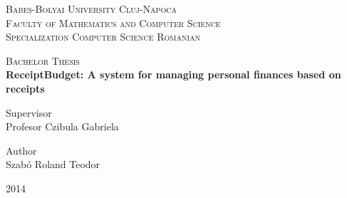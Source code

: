 \begin{titlepage}
    \begin{center}
        \vspace*{1cm}
        
        \Large
        \textsc{Babeș-Bolyai University Cluj-Napoca} \\
		\textsc{Faculty of Mathematics and Computer Science} \\
		\textsc{Specialization Computer Science Romanian}

		\vspace{1.5cm}
        \Huge
        \textsc{Bachelor Thesis} \\[1cm]
        \textbf{ReceiptBudget: A system for managing personal finances based on receipts}
\end{center}        

        \vspace{2cm}
		\Large
        \begin{minipage}[t]{0.5\textwidth}
       		Supervisor \\
        	Profesor Czibula Gabriela \\
		\end{minipage}
		\begin{minipage}[t]{0.5\textwidth}
			\begin{flushright}
				Author \\
				Szabó Roland Teodor
			\end{flushright}
		\end{minipage}
        \vfill

        \vspace{0.8cm}
\begin{center}
	\Huge
        2014
\end{center}
        
\end{titlepage}